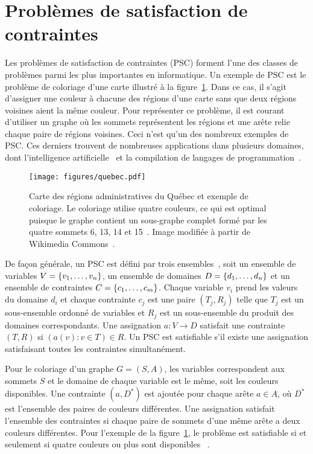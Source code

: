 \section{Problèmes de satisfaction de contraintes}
\label{sec:csp}

Les problèmes de satisfaction de contraintes (PSC)
forment l'une des classes de problèmes parmi les plus importantes en informatique.
Un exemple de PSC est le problème de coloriage d'une carte illustré à la figure~\ref{fig:quebec}.
Dans ce cas,
il s'agit d'assigner une couleur à chacune des régions d'une carte sans que deux régions voisines 
aient la même couleur.
Pour représenter ce problème,
il est courant d'utiliser un graphe où les sommets représentent les régions et une arête relie
chaque paire de régions voisines.
Ceci n'est qu'un des nombreux exemples de PSC.
Ces derniers trouvent de nombreuses applications dans plusieurs domaines,
dont l'intelligence artificielle~\cite{russel_artificial_nodate}
et la compilation de langages de programmation~\cite{aho_compilers_2006}.

\begin{figure}
  \begin{center}
    \texttt{[image: figures/quebec.pdf]}
  \end{center}
  \caption[Exemple du problème de coloriage d'une carte]{
    Carte des régions administratives du Québec et exemple de coloriage. 
    Le coloriage utilise quatre couleurs,
    ce qui est optimal puisque le graphe contient un sous-graphe complet
    formé par les quatre sommets 6, 13, 14 et 15~\cite{kubale_graph_2004}.
    Image modifiée à partir de Wikimedia Commons~\cite{noauthor_carte_2016}.
  }
  \label{fig:quebec}
\end{figure}

De façon générale,
un PSC est défini par trois ensembles~\cite{lecoutre_constraint_2009},
soit un ensemble de variables $V = \qty{v_1, \ldots, v_n}$,
un ensemble de domaines $D = \qty{d_1, \ldots, d_n}$
et un ensemble de contraintes $C = \qty{c_1, \ldots, c_m}$.
Chaque variable $v_i$ prend les valeurs du domaine $d_i$
et chaque contrainte $c_j$ est une paire $(T_j, R_j)$
telle que $T_j$ est un sous-ensemble ordonné de variables et $R_j$
est un sous-ensemble du produit des domaines correspondants.
Une assignation $a: V \to D$ satisfait une contrainte $(T, R)$ 
si $(a(v) : v \in T) \in R$.
Un PSC est satisfiable s'il existe une assignation 
satisfaisant toutes les contraintes simultanément.

Pour le coloriage d'un graphe $G = (S, A)$,
les variables correspondent aux sommets $S$
et le domaine de chaque variable est le même,
soit les couleurs disponibles.
Une contrainte $(a, D^*)$ est ajoutée pour chaque arête $a \in A$,
où $D^*$ est l'ensemble des paires de couleurs différentes.
Une assignation satisfait l'ensemble des contraintes 
si chaque paire de sommets d'une même arête a deux couleurs différentes.
Pour l'exemple de la figure~\ref{fig:quebec},
le problème est satisfiable si et seulement si quatre couleurs 
ou plus sont disponibles ~\cite{kubale_graph_2004}.

